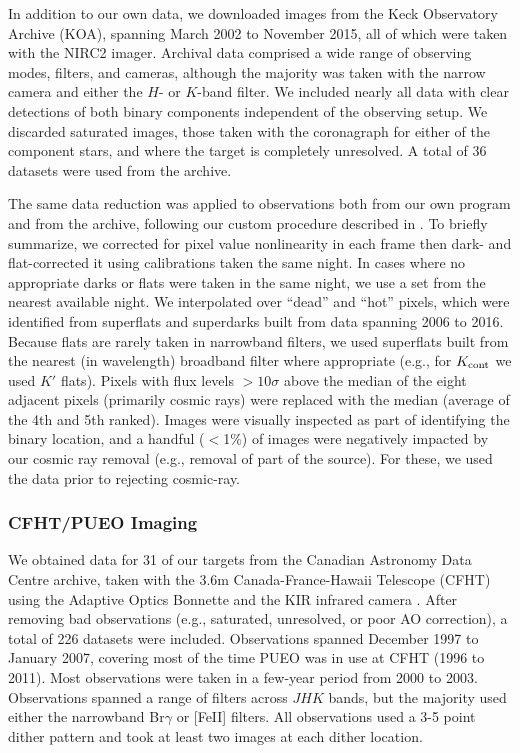 \documentclass[twocolumn]{aastex62}
\begin{document}
In addition to our own data, we downloaded images from the Keck Observatory Archive (KOA), spanning March 2002 to November 2015, all of which were taken with the NIRC2 imager. Archival data comprised a wide range of observing modes, filters, and cameras, although the majority was taken with the narrow camera and either the $H$- or $K$-band filter. We included nearly all data with clear detections of both binary components independent of the observing setup. We discarded saturated images, those taken with the coronagraph for either of the component stars, and where the target is completely unresolved. A total of 36 datasets were used from the archive. 

The same data reduction was applied to observations both from our own program and from the archive, following our custom procedure described in \citet{Kraus2016a}. To briefly summarize, we corrected for pixel value nonlinearity in each frame then dark- and flat-corrected it using calibrations taken the same night. In cases where no appropriate darks or flats were taken in the same night, we use a set from the nearest available night. We interpolated over ``dead'' and ``hot'' pixels, which were identified from superflats and superdarks built from data spanning 2006 to 2016. Because flats are rarely taken in narrowband filters, we used superflats built from the nearest (in wavelength) broadband filter where appropriate (e.g., for $K_{\rm{cont}}$ we used $K'$ flats). Pixels with flux levels $>10\sigma$ above the median of the eight adjacent pixels (primarily cosmic rays) were replaced with the median (average of the 4th and 5th ranked). Images were visually inspected as part of identifying the binary location, and a handful ($<$1\%) of images were negatively impacted by our cosmic ray removal (e.g., removal of part of the source). For these, we used the data prior to rejecting cosmic-ray.


\subsubsection{CFHT/PUEO Imaging}

We obtained data for 31 of our targets from the Canadian Astronomy Data Centre archive, taken with the 3.6m Canada-France-Hawaii Telescope (CFHT) using the Adaptive Optics Bonnette \citep[AOB, often referred to as PUEO after the Hawaiian owl,][]{1994SPIE.2201..833A} and the KIR infrared camera \citep{1998SPIE.3354..760D}. After removing bad observations (e.g., saturated, unresolved, or poor AO correction), a total of 226 datasets were included. Observations spanned December 1997 to January 2007, covering most of the time PUEO was in use at CFHT (1996 to 2011). Most observations were taken in a few-year period from 2000 to 2003. Observations spanned a range of filters across $JHK$ bands, but the majority used either the narrowband Br$\gamma$ or [FeII] filters. All observations used a 3-5 point dither pattern and took at least two images at each dither location. 
\end{document}
